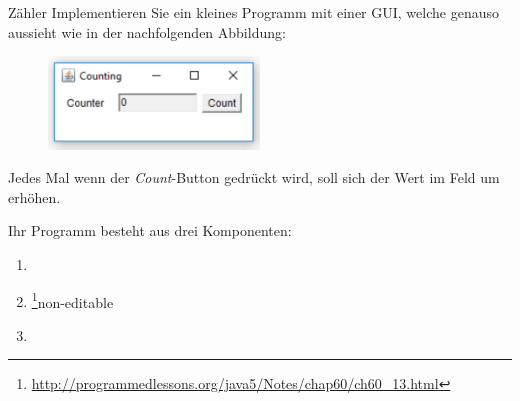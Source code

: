 \documentclass{../tuda-exercise}
\begin{document}
  \clearpagesolution

  \begin{task}[credit = \stars{3}{3}]{Zähler}
    Implementieren Sie ein kleines Programm mit einer GUI, welche genauso aussieht wie in der
    nachfolgenden Abbildung:

    \begin{figure}[h]
      \centering
      \includegraphics[width = 0.5\textwidth]{graphics/V7_Task.png}
    \end{figure}

    Jedes Mal wenn der \textit{Count}-Button gedrückt wird, soll sich der Wert im Feld um
     erhöhen.

    \br

    \begin{note}[title=Hinweis:, color=tuda-orange]
      Ihr Programm besteht aus drei Komponenten:
      \begin{enumerate}
        \item {} \code{\textcolor{stringcolor}{"'Counter"'}}
        \item \footnote{\url{http://programmedlessons.org/java5/Notes/chap60/ch60_13.html}}{non-editable}
        \item {} \code{\textcolor{stringcolor}{"'Count"'}}
      \end{enumerate}
    \end{note}

    \clearpagesolution

    \begin{solution}
      
    \end{solution}
  \end{task}
\end{document}
